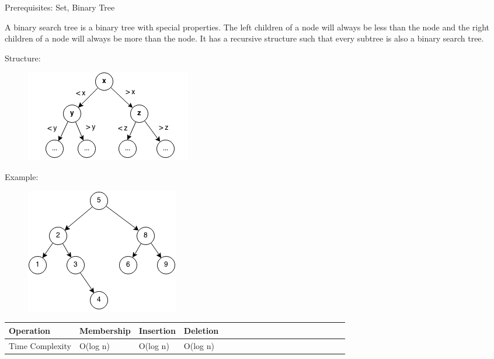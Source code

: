 \documentclass[11pt,oneside]{book}
\makeatletter
\def\maxwidth#1{\ifdim\Gin@nat@width>#1 #1\else\Gin@nat@width\fi}
\makeatother
\begin{document}
Prerequisites: Set, Binary Tree

A binary search tree is a  binary tree with special properties. The left children of a node will always be less than the node and the right children of a node will always be more than the node. It has a recursive structure such that every subtree is also a binary search tree.

Structure:

\vspace{5px}\begin{figure}[H]\centering
        \includegraphics[width=0.66\maxwidth{\textwidth}]{bstcompare.png}
        \end{figure}

Example:

\vspace{5px}\begin{figure}[H]\centering
        \includegraphics[width=0.66\maxwidth{\textwidth}]{bst.png}
        \end{figure}

\begin{center}\begin{tabulary}{0.4\linewidth}{|l|l|l|l|l|l|l|l|l|l|l|l|l|l|l|l|l|l|l}\hline


  Operation &
  Membership &
  Insertion &
  Deletion\\
\hline


  Time Complexity &
  O(log n) &
  O(log n) &
  O(log n)\\

\hline\end{tabulary}\end{center}
\end{document}
